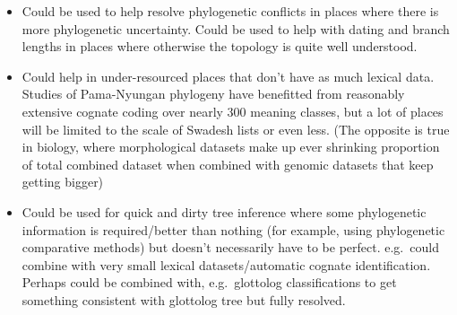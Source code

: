\begin{itemize}
\tightlist
\item
  Could be used to help resolve phylogenetic conflicts in places where there is more phylogenetic uncertainty. Could be used to help with dating and branch lengths in places where otherwise the topology is quite well understood.
\item
  Could help in under-resourced places that don't have as much lexical data. Studies of Pama-Nyungan phylogeny have benefitted from reasonably extensive cognate coding over nearly 300 meaning classes, but a lot of places will be limited to the scale of Swadesh lists or even less. (The opposite is true in biology, where morphological datasets make up ever shrinking proportion of total combined dataset when combined with genomic datasets that keep getting bigger)
\item
  Could be used for quick and dirty tree inference where some phylogenetic information is required/better than nothing (for example, using phylogenetic comparative methods) but doesn't necessarily have to be perfect. e.g.~could combine with very small lexical datasets/automatic cognate identification. Perhaps could be combined with, e.g.~glottolog classifications to get something consistent with glottolog tree but fully resolved.
\end{itemize}

